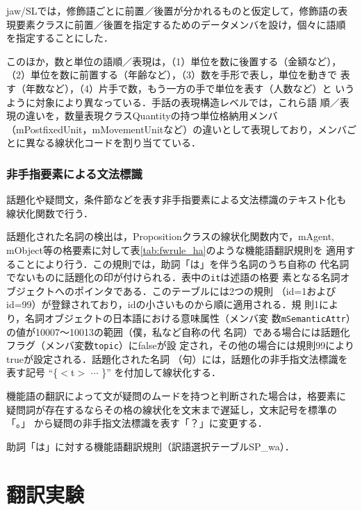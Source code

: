 \documentclass[japanese]{jnlp_1.4}
\begin{document}
jaw/SLでは，修飾語ごとに前置／後置が分かれるものと仮定して，修飾語の表
現要素クラスに前置／後置を指定するためのデータメンバを設け，個々に語順
を指定することにした．

このほか，数と単位の語順／表現は，（1）単位を数に後置する（金額など），
（2）単位を数に前置する（年齢など），（3）数を手形で表し，単位を動きで
表す（年数など），（4）片手で数，もう一方の手で単位を表す（人数など）と
いうように対象により異なっている．手話の表現構造レベルでは，これら語
順／表現の違いを，数量表現クラスQuantityの持つ単位格納用メンバ
（mPostfixedUnit，mMovementUnitなど）の違いとして表現しており，メンバご
とに異なる線状化コードを割り当てている．




\subsubsection{非手指要素による文法標識}

話題化や疑問文，条件節などを表す非手指要素による文法標識のテキスト化も
線状化関数で行う．

話題化された名詞の検出は，Propositionクラスの線状化関数内で，mAgent,
mObject等の格要素に対して表\ref{tab:fwrule_ha}のような機能語翻訳規則を
適用することにより行う．この規則では，助詞「は」を伴う名詞のうち自称の
代名詞でないものに話題化の印が付けられる．表中の\texttt{it}は述語の格要
素となる名詞オブジェクトへのポインタである．このテーブルには2つの規則
（id=1およびid=99）が登録されており，idの小さいものから順に適用される．規
則1により，名詞オブジェクトの日本語における意味属性（メンバ変
数\texttt{mSemanticAttr}）の値が10007〜10013の範囲（僕，私など自称の代
名詞）である場合には話題化フラグ（メンバ変数\texttt{topic}）にfalseが設
定され，その他の場合には規則99によりtrueが設定される．話題化された名詞
（句）には，話題化の非手指文法標識を表す記号 ``\{$<$t$>$ $\cdots$
\}'' を付加して線状化する．

機能語の翻訳によって文が疑問のムードを持つと判断された場合は，格要素に
疑問詞が存在するならその格の線状化を文末まで遅延し，文末記号を標準の「。」
から疑問の非手指文法標識を表す「？」に変更する．

\begin{table}[t]
\caption{助詞「は」に対する機能語翻訳規則（訳語選択テーブルSP\_wa）．}
  \label{tab:fwrule_ha}
  \centering

\end{table}



\section{翻訳実験}
\end{document}
